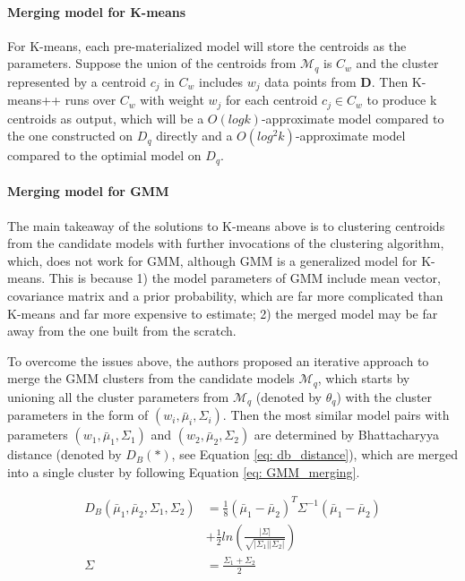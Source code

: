 \paragraph{Merging model for K-means}
For K-means, each pre-materialized model will store the centroids as the parameters. Suppose the union of the centroids from $\mathcal{M}_q$ is $C_w$ and the cluster represented by a centroid $c_j$ in $C_w$ includes $w_j$ data points from $\textbf{D}$. Then K-means++ \cite{arthur2007k} runs over $C_w$ with weight $w_j$ for each centroid $c_j \in C_w$ to produce k centroids as output, which will be a $O(log k)$-approximate model compared to the one constructed on $D_q$ directly and a $O(log^2k)$-approximate model compared to the optimial model on $D_q$.

\paragraph{Merging model for GMM}
The main takeaway of the solutions to K-means above is to clustering centroids from the candidate models with further invocations of the clustering algorithm, which, does not work for GMM, although GMM is a generalized model for K-means. This is because 1) the model parameters of GMM include mean vector, covariance matrix and a prior probability, which are far more complicated than K-means and far more expensive to estimate; 2) the merged model may be far away from the one built from the scratch. 

To overcome the issues above, the authors proposed an iterative approach to merge the GMM clusters from the candidate models $\mathcal{M}_q$, which starts by unioning all the cluster parameters from $\mathcal{M}_q$ (denoted by $\theta_q$) with the cluster parameters in the form of $(w_i, \bar{\mu}_i, \Sigma_i)$.
Then the most similar model pairs with parameters $(w_1, \bar{\mu}_1, \Sigma_1)$ and $(w_2, \bar{\mu}_2, \Sigma_2)$ are determined by Bhattacharyya distance \cite{bhattacharyya1943measure} (denoted by $D_B(*)$, see Equation \ref{eq: db_distance}), which are merged into a single cluster by following Equation \ref{eq: GMM_merging}.

\begin{equation}\label{eq: db_distance}
\begin{split}
    D_B(\bar{\mu}_1, \bar{\mu}_2, \Sigma_1, \Sigma_2) &=
    \frac{1}{8}(\bar{\mu}_1-\bar{\mu}_2)^T\Sigma^{-1}(\bar{\mu}_1 -\bar{\mu}_2) \\&+ \frac{1}{2}ln(\frac{|\Sigma|}{\sqrt{|\Sigma_1||\Sigma_2|}})\\
    \Sigma &= \frac{\Sigma_1 + \Sigma_2}{2}
\end{split}
\end{equation}

